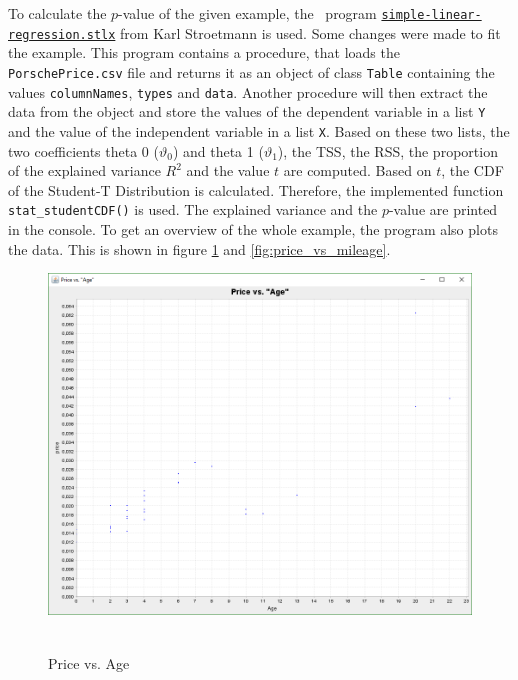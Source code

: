 	To calculate the $p$-value of the given example, the \setlx\ program \href{https://raw.githubusercontent.com/karlstroetmann/Artificial-Intelligence/master/SetlX/simple-linear-regression.stlx}{\lstinline{simple-linear-regression.stlx}} from Karl Stroetmann is used. Some changes were made to fit the example. This program contains a procedure, that loads the \lstinline{PorschePrice.csv} file and returns it as an object of class \lstinline{Table} containing the values \lstinline{columnNames}, \lstinline{types} and \lstinline{data}. Another procedure will then extract the data from the object and store the values of the dependent variable in a list \lstinline{Y} and the value of the independent variable in a list \lstinline{X}. Based on these two lists, the two coefficients theta 0 ($\vartheta _0$) and theta 1 ($\vartheta _1$), the \ac{TSS}, the \ac{RSS}, the proportion of the explained variance $R^{2}$ and the value $t$ are computed. Based on $t$, the \ac{CDF} of the Student-T Distribution is calculated. Therefore, the implemented function \lstinline{stat_studentCDF()} is used. The explained variance and the $p$-value are printed in the console. To get an overview of the whole example, the program also plots the data. This is shown in figure \ref{fig:price_vs_age} and \ref{fig:price_vs_mileage}.

	\begin{figure}[h]
		\centering
		\includegraphics[width=1\textwidth]{Figures/price_vs_age}~\\
		\caption{Price vs. Age}
		\label{fig:price_vs_age}
	\end{figure}

